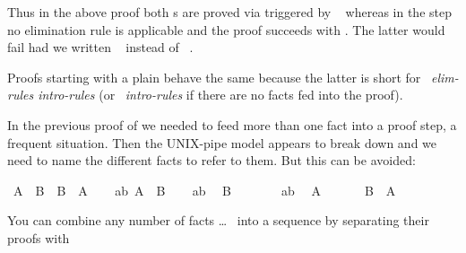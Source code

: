 \begin{isabellebody}
\begin{isamarkuptext}
Thus in the above proof both s are proved via
 triggered by ~ whereas
in the  step no elimination rule is applicable and
the proof succeeds with . The latter would fail had
we written ~ instead of
~.

Proofs starting with a plain  behave the same because the
latter is short for ~\textit{elim-rules
intro-rules}\isa{{\isacharparenright}} (or ~\textit{intro-rules}\isa{{\isacharparenright}} if there are no facts fed into
the proof).%
\end{isamarkuptext}%
\isamarkuptrue%
%
\isamarkuptrue%
%
\begin{isamarkuptext}%
In the previous proof of  we needed to feed
more than one fact into a proof step, a frequent situation. Then the
UNIX-pipe model appears to break down and we need to name the different
facts to refer to them. But this can be avoided:%
\end{isamarkuptext}%
\isamarkuptrue%
\isamarkupfalse%
\ {\isachardoublequoteopen}A\ {\isasymand}\ B\ {\isasymlongrightarrow}\ B\ {\isasymand}\ A{\isachardoublequoteclose}\isanewline
%
\isadelimproof
%
\endisadelimproof
%
\isatagproof
{}\isamarkupfalse%
\isanewline
\ \ \isamarkupfalse%
\ ab{\isacharcolon}\ {\isachardoublequoteopen}A\ {\isasymand}\ B{\isachardoublequoteclose}\isanewline
\ \ \isamarkupfalse%
\ ab\ \isamarkupfalse%
\ {\isachardoublequoteopen}B{\isachardoublequoteclose}\ \isacommand{{\isachardot}{\isachardot}}\isamarkupfalse%
\isanewline
\ \ \isamarkupfalse%
\isanewline
\ \ \isamarkupfalse%
\ ab\ \isamarkupfalse%
\ {\isachardoublequoteopen}A{\isachardoublequoteclose}\ \isacommand{{\isachardot}{\isachardot}}\isamarkupfalse%
\isanewline
\ \ \isamarkupfalse%
\ \isamarkupfalse%
\ {\isachardoublequoteopen}B\ {\isasymand}\ A{\isachardoublequoteclose}\ \isacommand{{\isachardot}{\isachardot}}\isamarkupfalse%
\isanewline
{}\isamarkupfalse%
%
\endisatagproof
{\isafoldproof}%
%
\isadelimproof
%
\endisadelimproof
%
\begin{isamarkuptext}%
\noindent You can combine any number of facts  \dots\  into a sequence by separating their proofs with

\end{isamarkuptext}
\end{isabellebody}
